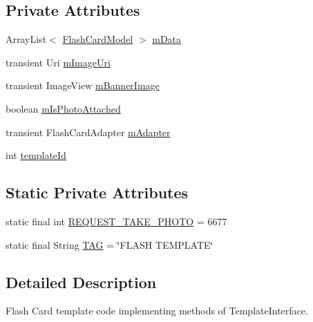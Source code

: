 \subsection*{Private Attributes}
\begin{DoxyCompactItemize}
\item 
Array\+List$<$ \hyperlink{classorg_1_1buildmlearn_1_1toolkit_1_1templates_1_1FlashCardModel}{Flash\+Card\+Model} $>$ \hyperlink{classorg_1_1buildmlearn_1_1toolkit_1_1templates_1_1FlashTemplate_a22f583de25594f6e010ceff3f45e30e0}{m\+Data}
\item 
transient Uri \hyperlink{classorg_1_1buildmlearn_1_1toolkit_1_1templates_1_1FlashTemplate_a5c746741b2733c55f00e458194733ab0}{m\+Image\+Uri}
\item 
transient Image\+View \hyperlink{classorg_1_1buildmlearn_1_1toolkit_1_1templates_1_1FlashTemplate_ab7e63f59edb292088a4d3fc0386eb741}{m\+Banner\+Image}
\item 
boolean \hyperlink{classorg_1_1buildmlearn_1_1toolkit_1_1templates_1_1FlashTemplate_a7b7bcf879c40f3e2fc7de5503627318f}{m\+Is\+Photo\+Attached}
\item 
transient Flash\+Card\+Adapter \hyperlink{classorg_1_1buildmlearn_1_1toolkit_1_1templates_1_1FlashTemplate_a4decea11a01f62e92db3e24bb93a25bb}{m\+Adapter}
\item 
int \hyperlink{classorg_1_1buildmlearn_1_1toolkit_1_1templates_1_1FlashTemplate_a00df07dcf4f09799ccba120c9ef45e46}{template\+Id}
\end{DoxyCompactItemize}
\subsection*{Static Private Attributes}
\begin{DoxyCompactItemize}
\item 
static final int \hyperlink{classorg_1_1buildmlearn_1_1toolkit_1_1templates_1_1FlashTemplate_a587243f063c2b42ae7c457efe6752e28}{R\+E\+Q\+U\+E\+S\+T\+\_\+\+T\+A\+K\+E\+\_\+\+P\+H\+O\+TO} = 6677
\item 
static final String \hyperlink{classorg_1_1buildmlearn_1_1toolkit_1_1templates_1_1FlashTemplate_a276db76cabb84d7edd7c28d3fb649039}{T\+AG} = \char`\"{}F\+L\+A\+SH T\+E\+M\+P\+L\+A\+TE\char`\"{}
\end{DoxyCompactItemize}


\subsection{Detailed Description}
Flash Card template code implementing methods of Template\+Interface. 

